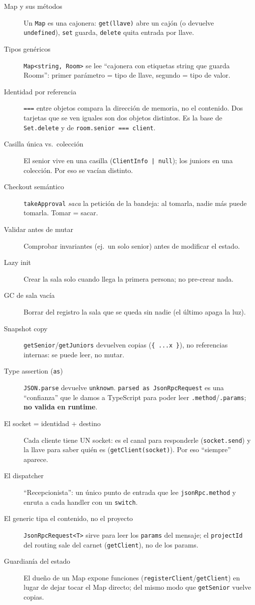 \documentclass[11pt,a4paper]{article}
\begin{document}
\begin{description}
  \item[Map y sus métodos] Un \texttt{Map} es una cajonera: \texttt{get(llave)}
        abre un cajón (o devuelve \texttt{undefined}), \texttt{set} guarda,
        \texttt{delete} quita entrada por llave.
  \item[Tipos genéricos] \texttt{Map<string, Room>} se lee ``cajonera con
        etiquetas string que guarda Rooms'': primer parámetro = tipo de llave,
        segundo = tipo de valor.
  \item[Identidad por referencia] \texttt{===} entre objetos compara la
        dirección de memoria, no el contenido. Dos tarjetas que se ven iguales
        son dos objetos distintos. Es la base de \texttt{Set.delete} y de
        \texttt{room.senior === client}.
  \item[Casilla única vs.\ colección] El senior vive en una casilla
        (\texttt{ClientInfo | null}); los juniors en una colección. Por eso se
        vacían distinto.
  \item[Checkout semántico] \texttt{takeApproval} \emph{saca} la petición de la
        bandeja: al tomarla, nadie más puede tomarla. Tomar = sacar.
  \item[Validar antes de mutar] Comprobar invariantes (ej.\ un solo senior)
        antes de modificar el estado.
  \item[Lazy init] Crear la sala solo cuando llega la primera persona; no
        pre-crear nada.
  \item[GC de sala vacía] Borrar del registro la sala que se queda sin nadie
        (el último apaga la luz).
  \item[Snapshot copy] \texttt{getSenior}/\texttt{getJuniors} devuelven copias
        (\texttt{\{ ...x \}}), no referencias internas: se puede leer, no mutar.
  \item[Type assertion (\texttt{as})] \texttt{JSON.parse} devuelve \texttt{unknown}.
        \texttt{parsed as JsonRpcRequest} es una ``confianza'' que le damos a
        TypeScript para poder leer \texttt{.method}/\texttt{.params}; \textbf{no
        valida en runtime}.
  \item[El socket = identidad + destino] Cada cliente tiene UN socket: es el
        canal para responderle (\texttt{socket.send}) y la llave para saber quién
        es (\texttt{getClient(socket)}). Por eso ``siempre'' aparece.
  \item[El dispatcher] ``Recepcionista'': un único punto de entrada que lee
        \texttt{jsonRpc.method} y enruta a cada handler con un \texttt{switch}.
  \item[El generic tipa el contenido, no el proyecto] \texttt{JsonRpcRequest<T>}
        sirve para leer los \texttt{params} del mensaje; el \texttt{projectId}
        del routing sale del carnet (\texttt{getClient}), no de los params.
  \item[Guardianía del estado] El dueño de un Map expone funciones
        (\texttt{registerClient}/\texttt{getClient}) en lugar de dejar tocar el
        Map directo; del mismo modo que \texttt{getSenior} vuelve copias.
\end{description}
\end{document}
